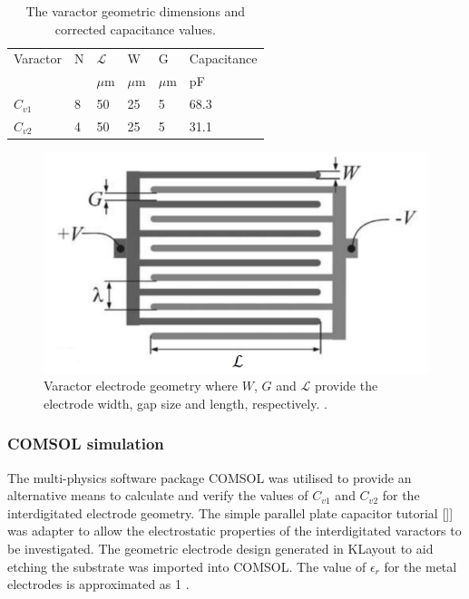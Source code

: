 \begin{table}[h!]
  \begin{center}
    \caption{The varactor geometric dimensions and corrected capacitance values.}
    \label{tab:varactordimensions}
    \begin{tabular}{l|l|l|l|l|l|} %
      Varactor & N & $\mathcal{L}$ & W & G & Capacitance \\
       & & $\mu$m & $\mu$m & $\mu$m & pF \\
       \hline
       $C_{v1}$ & 8 & 50 & 25 & 5 & 68.3 \\
       $C_{v2}$ & 4 & 50 & 25 & 5 & 31.1\\
    \end{tabular}
  \end{center}
\end{table}


\begin{figure}[t]
\centering
\includegraphics[height=0.3\textwidth,keepaspectratio]{interdigitalvaractor}
\caption{\label{fig:interdigitalvaractor} Varactor electrode geometry where $W$, $G$ and $\mathcal{L}$ provide the electrode width, gap size and length, respectively. \citep{Igreja2004AnalyticalStructure}.}
\end{figure}

\subsubsection{\label{subsubsec:COMSOLsimulation}COMSOL simulation}
The multi-physics software package COMSOL was utilised to provide an alternative means to calculate and verify the values of $C_{v1}$ and $C_{v2}$ for the interdigitated electrode geometry. The simple parallel plate capacitor tutorial [\citep{COMSOLtut}]] was adapter to allow the electrostatic properties of the interdigitated varactors to be investigated. The geometric electrode design generated in KLayout to aid etching the substrate was imported into COMSOL. The value of $\epsilon_{r}$ for the metal electrodes is approximated as 1 \citep{PhysRevB.6.4370}. 

